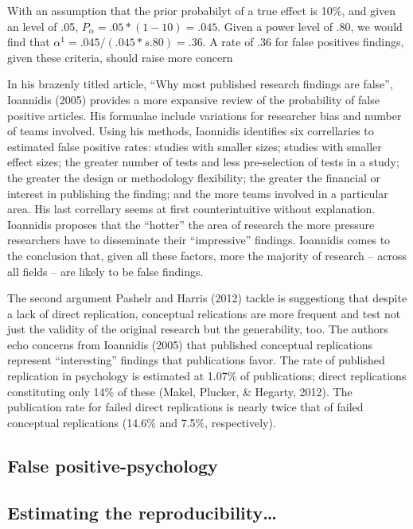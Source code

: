\documentclass[man]{apa6}
\theoremstyle{definition}
\theoremstyle{definition}
\theoremstyle{definition}
\theoremstyle{remark}
\begin{document}
With an assumption that the prior probabilyt of a true effect is 10\%,
and given an \alpha level of .05, \(P_\alpha = .05 * (1 - 10) = .045\).
Given a power level of .80, we would find that
\(\alpha^1 = .045 / (.045 *s .80) = .36\). A rate of .36 for false
positives findings, given these criteria, should raise more concern

In his brazenly titled article, \enquote{Why most published research
findings are false}, Ioannidis (2005) provides a more expansive review
of the probability of false positive articles. His formualae include
variations for researcher bias and number of teams involved. Using his
methods, Iaonnidis identifies six correllaries to estimated false
positive rates: studies with smaller sizes; studies with smaller effect
sizes; the greater number of tests and less pre-selection of tests in a
study; the greater the design or methodology flexibility; the greater
the financial or interest in publishing the finding; and the more teams
involved in a particular area. His last correllary seems at first
counterintuitive without explanation. Ioannidis proposes that the
\enquote{hotter} the area of research the more pressure researchers have
to disseminate their \enquote{impressive} findings. Ioannidis comes to
the conclusion that, given all these factors, more the majority of
research -- across all fields -- are likely to be false findings.

The second argument Pashelr and Harris (2012) tackle is suggestiong that
despite a lack of direct replication, conceptual relications are more
frequent and test not just the validity of the original research but the
generability, too. The authors echo concerns from Ioannidis (2005) that
published conceptual replications represent \enquote{interesting}
findings that publications favor. The rate of published replication in
psychology is estimated at 1.07\% of publications; direct replications
constituting only 14\% of these (Makel, Plucker, \& Hegarty, 2012). The
publication rate for failed direct replications is nearly twice that of
failed conceptual replications (14.6\% and 7.5\%, respectively).

\hypertarget{false-positive-psychology}{%
\subsection{False positive-psychology}\label{false-positive-psychology}}

\hypertarget{estimating-the-reproducibility}{%
\subsection{Estimating the
reproducibility\ldots{}}\label{estimating-the-reproducibility}}
\end{document}
